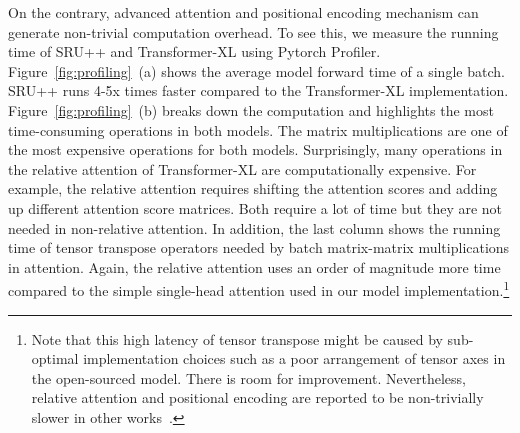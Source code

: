 On the contrary, advanced attention and positional encoding mechanism can generate non-trivial computation overhead.
To see this, we measure the running time of SRU++ and Transformer-XL using Pytorch Profiler. 
Figure~\ref{fig:profiling}~(a) shows the average model forward time of a single batch.
SRU++ runs 4-5x times faster compared to the Transformer-XL implementation. 
Figure~\ref{fig:profiling}~(b) breaks down the computation and highlights the most time-consuming operations in both models.
The matrix multiplications are one of the most expensive operations for both models.
Surprisingly, many operations in the relative attention of Transformer-XL are computationally expensive.
For example, the relative attention requires shifting the attention scores and adding up different attention score matrices.
Both require a lot of time but they are not needed in non-relative attention.
In addition, the last column shows the running time of tensor transpose operators needed by batch matrix-matrix multiplications in attention.
Again, the relative attention uses an order of magnitude more time compared to the simple single-head attention used in our model implementation.\footnote{Note that this high latency of tensor transpose might be caused by sub-optimal implementation choices such as a poor arrangement of tensor axes in the open-sourced model. There is room for improvement. Nevertheless, relative attention and positional encoding are reported to be non-trivially slower in other works~\cite{shaw-etal-2018-self,tian2021shatter}.}

